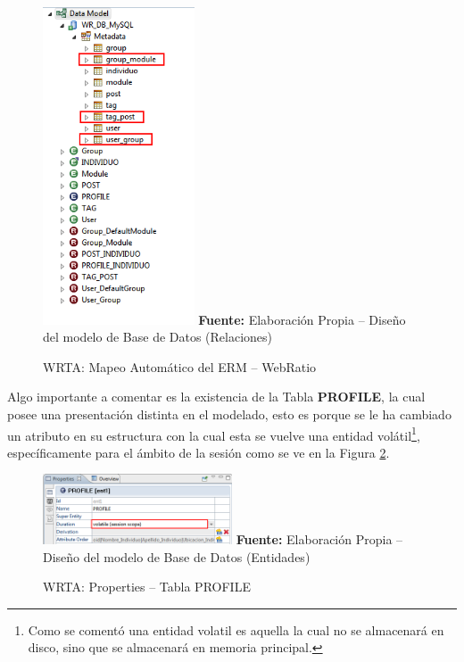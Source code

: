 \documentclass[oneside,12pt,a4paper]{memoir}%
\begin{document}
	\begin{figure}[here]
		\centering 
		\caption{WRTA: Mapeo Autom\'atico del \ac{ERM} -- WebRatio}
		\includegraphics[width=0.4\textwidth]{figure/fig_WR_autoModelling.png}
		\newline
		\textbf{Fuente:} Elaboraci\'on Propia -- Dise\~no del modelo de Base de Datos
		(Relaciones)
		\label{fig:WRTA_fig_WR_autoModelling}
	\end{figure} 
	
	Algo importante a comentar es la existencia de la Tabla \textbf{PROFILE}, la
	cual posee una presentaci\'on distinta en el modelado, esto es porque se le ha
	cambiado un atributo en su estructura con la cual esta se vuelve una
	entidad vol\'atil\footnote{Como se coment\'o una entidad volatil es aquella
	la cual no se almacenar\'a en disco, sino que se almacenar\'a en memoria
	principal.}, espec\'ificamente para el \'ambito de la sesi\'on como se ve en la
	Figura \ref{fig:profileTableProperties}.
	
	\begin{figure}[here]
		\centering
		\caption{WRTA: Properties -- Tabla PROFILE}
		\includegraphics[width=0.5\textwidth]{figure/fig_profileProperties.png}
		\newline
		\textbf{Fuente:} Elaboraci\'on Propia -- Dise\~no del modelo de Base de Datos
		(Entidades)
		\label{fig:profileTableProperties}
	\end{figure}
	
\end{document}
